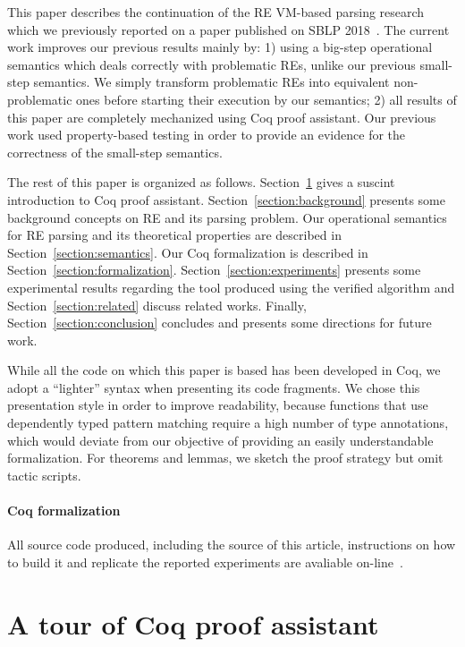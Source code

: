 \documentclass[review]{elsarticle}
\theoremstyle{definition}
\begin{document}
This paper describes the continuation of the RE VM-based parsing research which we previously reported 
on a paper published on SBLP 2018~\cite{Delfino18}. The current work improves our previous results
mainly by: 1) using a big-step operational semantics which deals correctly with problematic REs, unlike
our previous small-step semantics. We simply transform problematic REs into
equivalent non-problematic ones before starting their execution by our semantics;
2) all results of this paper are completely mechanized using Coq
proof assistant. Our previous work used property-based testing in order to provide an evidence for 
the correctness of the small-step semantics.    

The rest of this paper is organized as follows. Section~\ref{section:coq} gives a 
suscint introduction to Coq proof assistant. Section~\ref{section:background} presents some 
background concepts on RE and its parsing problem. 
Our operational semantics for RE parsing and its theoretical properties
are described in Section~\ref{section:semantics}. Our Coq formalization is described in 
Section~\ref{section:formalization}.  Section~\ref{section:experiments} presents some experimental
results regarding the tool produced using the verified algorithm and Section~\ref{section:related} discuss
related works. Finally, Section~\ref{section:conclusion} concludes and 
presents some directions for future work.

While all the code on which this paper is based has been developed in Coq,
we adopt a ``lighter'' syntax when presenting its code fragments. 
We chose this presentation style in order to improve readability, because
 functions that use dependently typed pattern matching require a high number of type
 annotations, which would deviate from our objective of providing an easily
 understandable formalization. For theorems and lemmas, we sketch the proof strategy 
 but omit tactic scripts.

\paragraph{Coq formalization} All source code produced, including the source of this article, 
instructions on how to build it and replicate the reported experiments are avaliable 
on-line~\cite{regexvm-rep}.

\section{A tour of Coq proof assistant}\label{section:coq}
\end{document}
